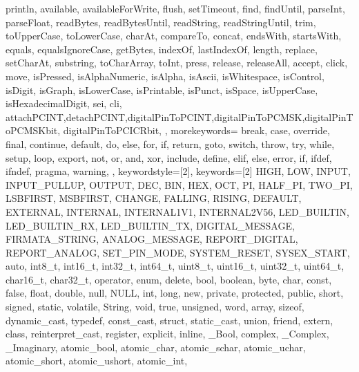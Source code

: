 {{                println, available, availableForWrite, flush, setTimeout, find, 
                findUntil, parseInt, parseFloat, readBytes, readBytesUntil, readString, 
                readStringUntil, trim, toUpperCase, toLowerCase, charAt, compareTo, 
                concat, endsWith, startsWith, equals, equalsIgnoreCase, getBytes, 
                indexOf, lastIndexOf, length, replace, setCharAt, substring, 
                toCharArray, toInt, press, release, releaseAll, accept, click, move, 
                isPressed, isAlphaNumeric, isAlpha, isAscii, isWhitespace, isControl, 
                isDigit, isGraph, isLowerCase, isPrintable, isPunct, isSpace, 
                isUpperCase, isHexadecimalDigit, sei, cli,
                attachPCINT,detachPCINT,digitalPinToPCINT,digitalPinToPCMSK,digitalPinToPCMSKbit,
                digitalPinToPCICRbit,
                }, 
  morekeywords={   %
                break, case, override, final, continue, default, do, else, for, 
                if, return, goto, switch, throw, try, while, setup, loop, export, 
                not, or, and, xor, include, define, elif, else, error, if, ifdef, 
                ifndef, pragma, warning,
                }, 
% 
%
  keywordstyle=[2]\color{arduinoBlue},   
  keywords=[2]{   %
                HIGH, LOW, INPUT, INPUT_PULLUP, OUTPUT, DEC, BIN, HEX, OCT, PI, 
                HALF_PI, TWO_PI, LSBFIRST, MSBFIRST, CHANGE, FALLING, RISING, 
                DEFAULT, EXTERNAL, INTERNAL, INTERNAL1V1, INTERNAL2V56, LED_BUILTIN, 
                LED_BUILTIN_RX, LED_BUILTIN_TX, DIGITAL_MESSAGE, FIRMATA_STRING, 
                ANALOG_MESSAGE, REPORT_DIGITAL, REPORT_ANALOG, SET_PIN_MODE, 
                SYSTEM_RESET, SYSEX_START, auto, int8_t, int16_t, int32_t, int64_t, 
                uint8_t, uint16_t, uint32_t, uint64_t, char16_t, char32_t, operator, 
                enum, delete, bool, boolean, byte, char, const, false, float, double, 
                null, NULL, int, long, new, private, protected, public, short, 
                signed, static, volatile, String, void, true, unsigned, word, array, 
                sizeof, dynamic_cast, typedef, const_cast, struct, static_cast, union, 
                friend, extern, class, reinterpret_cast, register, explicit, inline, 
                _Bool, complex, _Complex, _Imaginary, atomic_bool, atomic_char, 
                atomic_schar, atomic_uchar, atomic_short, atomic_ushort, atomic_int, 
}}

